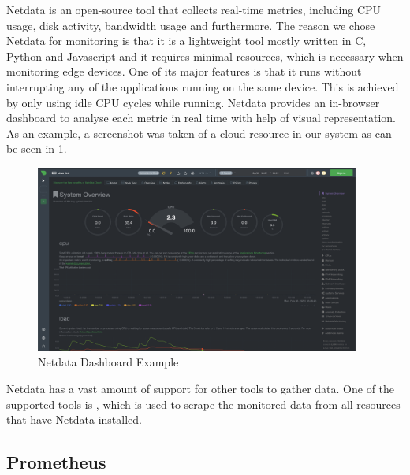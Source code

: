     Netdata \cite{netdataGettingStartedLearn2023} is an open-source tool that collects real-time metrics, including CPU usage, disk activity, bandwidth usage and furthermore.
    The reason we chose Netdata for monitoring is that it is a lightweight tool mostly written in C, Python and Javascript and it requires minimal resources, which is necessary when monitoring edge devices.
    One of its major features is that it runs without interrupting any of the applications running on the same device. This is achieved by only using idle CPU cycles while running.
    Netdata provides an in-browser dashboard to analyse each metric in real time with help of visual representation. As an example, a screenshot was taken of a cloud resource in our system as can be seen in \ref{fig:netdata-dashboard}.
    \begin{figure}[h!]
        \centering
        \includegraphics[width=0.95\textwidth]{figures/netdata.png}
        \caption{Netdata Dashboard Example}
        \label{fig:netdata-dashboard}
    \end{figure}
    Netdata has a vast amount of support for other tools to gather data. 
    One of the supported tools is , which is used to scrape the monitored data from all resources that have Netdata installed. 

  \subsection{Prometheus}
  \label{sec:prometheus-third-party}
  
